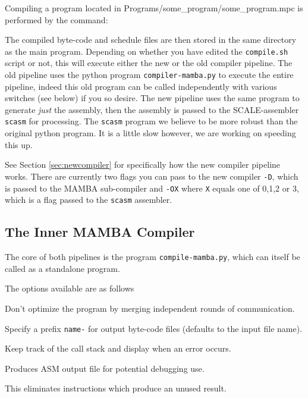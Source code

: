 Compiling a program located in Programs/some\_program/some\_program.mpc is performed by the
command:


\noindent The compiled byte-code and schedule files are then stored in the
same directory as the main program.
Depending on whether you have edited the \verb+compile.sh+ script or
not, this will execute either the new or the old compiler pipeline.
The old pipeline uses the python program \verb+compiler-mamba.py+ to
execute the entire pipeline, indeed this old program can be called independently
with various switches (see below) if you so desire.
The new pipeline uses the same program to generate {\em just} the
assembly, then the assembly is passed to the SCALE-assembler \verb+scasm+ for
processing. The \verb+scasm+ program we believe to be more robust than the
original python program. It is a little slow however, we are working on
speeding this up.

See Section \ref{sec:newcompiler} for specifically how the new
compiler pipeline works.
There are currently two flags you can pass to the new compiler
\verb+-D+, which is passed to the MAMBA sub-compiler and
\verb+-OX+ where \verb+X+ equals one of 0,1,2 or 3, which is
a flag passed to the \verb+scasm+ assembler.

\subsection{The Inner MAMBA Compiler}
The core of both pipelines is the program \verb+compile-mamba.py+,
which can itself be called as a standalone program.


\noindent
The options available are as follows

Don't optimize the program by merging independent rounds of communication.

Specify a prefix \verb|name-| for output byte-code files (defaults to the input file name).

Keep track of the call stack and display when an error occurs.

Produces ASM output file for potential debugging use.

This eliminates instructions which produce an unused result.

